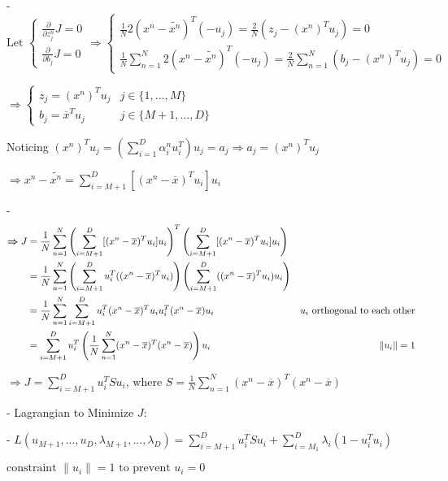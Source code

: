 - $\text{Let } \begin{cases} \displaystyle \frac \partial {\partial z^n_j} J=0 \\ \displaystyle \frac \partial {\partial b_j}J=0 \end{cases} \Rightarrow \begin{cases} \displaystyle \frac 1 N 2(x^n-\widetilde{x^n})^T (-u_j) = \frac 2 N (z_j-(x^n)^Tu_j)=0 \\ \displaystyle \frac 1 N \sum_{n=1}^N2 (x^n-\widetilde {x^n})^T(-u_j) = \frac 2 N \sum_{n=1}^N (b_j-(x^n)^Tu_j)=0 \end{cases}$ 

$\Rightarrow \begin{cases} z_j=(x^n)^Tu_j & j\in\{1,...,M\}\\ b_j=\overline{x}^Tu_j & j\in\{M+1,...,D\} \end{cases}$ 

Noticing $\displaystyle (x^n)^Tu_j=(\sum_{i=1}^D\alpha_i^nu_i^T)u_j = a_j \Rightarrow a_j = (x^n)^Tu_j$ 

$\displaystyle \Rightarrow x^n-\widetilde{x^n} = \sum_{i=M+1}^D[(x^n-\overline x)^Tu_i]u_i$ 

- \begin{align} \boldsymbol \Rightarrow \displaystyle J &= \frac 1 N \sum_{n=1}^N\space \left( \sum_{i=M+1}^D [(x^n-\overline x)^Tu_i]u_i\right)^T \left(\sum_{i=M+1}^D [(x^n-\overline x)^Tu_i]u_i\right) \\ &= \frac 1 N \sum_{n=1}^N \left( \sum_{i=M+1}^Du_i^T ((x^n-\overline x)^Tu_i)\right) \left( \sum_{i=M+1}^D ((x^n-\overline x)^Tu_i)u_i \right) \\ &= \frac 1 N \sum_{n=1}^N \sum_{i=M+1}^D u_i^T(x^n-\overline x)^Tu_iu_i^T(x^n-\overline x)u_i & u_i \text{ orthogonal to each other} \\ &= \sum_{i=M+1}^D u_i^T \left( \frac 1 N \sum_{n=1}^N(x^n-\overline x)^T(x^n-\overline x)\right) u_i & \|u_i\|=1 \\ \end{align} 

$ \displaystyle \boldsymbol \Rightarrow J =  \sum_{i=M+1}^D u_i^TSu_i \text{, where }S=\frac 1 N\sum_{n=1}^N(x^n-\overline x)^T(x^n-\overline x)$

- Lagrangian to Minimize $J$: 

- $\displaystyle L(u_{M+1},...,u_D,\lambda_{M+1},...,\lambda_D) = \sum_{i=M+1}^Du_i^TSu_i + \sum_{i=M_1}^D \lambda_i(1-u_i^Tu_i)$ 

	\(\text{constraint $\|u_i\|=1$ to prevent $u_i=0$}\)


